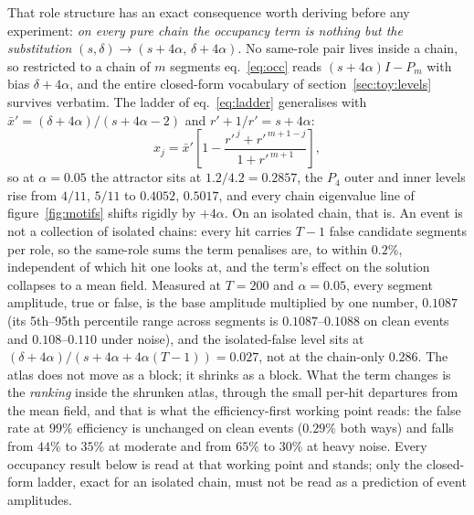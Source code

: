 \documentclass[11pt,a4paper]{article}
\begin{document}
That role structure has an exact consequence worth deriving before
any experiment: \emph{on every pure chain the occupancy term is
nothing but the substitution} $(s,\delta)\to(s{+}4\alpha,\,
\delta{+}4\alpha)$. No same-role pair lives inside a chain, so
restricted to a chain of $m$ segments eq.~\eqref{eq:occ} reads
$(s+4\alpha)I-P_m$ with bias $\delta+4\alpha$, and the entire
closed-form vocabulary of section~\ref{sec:toy:levels} survives
verbatim. The ladder of eq.~\eqref{eq:ladder} generalises with
$\bar x'=(\delta+4\alpha)/(s+4\alpha-2)$ and
$r'+1/r'=s+4\alpha$:
\begin{equation}
x_j=\bar x'\left[1-\frac{r'^{\,j}+r'^{\,m+1-j}}{1+r'^{\,m+1}}\right],
\label{eq:laddocc}
\end{equation}
so at $\alpha=0.05$ the attractor sits at
$1.2/4.2=0.2857$, the $P_4$ outer and inner levels rise from
$4/11,\,5/11$ to $0.4052,\,0.5017$, and every chain eigenvalue line
of figure~\ref{fig:motifs} shifts rigidly by $+4\alpha$. On an
isolated chain, that is. An event is not a collection of isolated
chains: every hit carries $T-1$ false candidate segments per role, so
the same-role sums the term penalises are, to within $0.2\%$,
independent of which hit one looks at, and the term's effect on the
solution collapses to a mean field. Measured at $T=200$ and
$\alpha=0.05$, every segment amplitude, true or false, is the base
amplitude multiplied by one number, $0.1087$ (its 5th--95th
percentile range across segments is $0.1087$--$0.1088$ on clean
events and $0.108$--$0.110$ under noise), and the isolated-false level
sits at $(\delta+4\alpha)/(s+4\alpha+4\alpha(T-1))=0.027$, not at
the chain-only $0.286$. The atlas does not move as a block; it
shrinks as a block. What the term changes is the \emph{ranking}
inside the shrunken atlas, through the small per-hit departures from
the mean field, and that is what the efficiency-first working point
reads: the false rate at $99\%$ efficiency is unchanged on clean
events ($0.29\%$ both ways) and falls from $44\%$ to $35\%$ at
moderate and from $65\%$ to $30\%$ at heavy noise. Every occupancy
result below is read at that working point and stands; only the
closed-form ladder, exact for an isolated chain, must not be read as
a prediction of event amplitudes.
\end{document}
